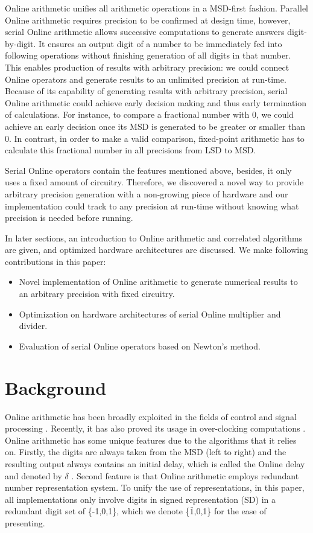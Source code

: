 \documentclass{sig-alternate}
\begin{document}
	Online arithmetic unifies all arithmetic operations in a MSD-first fashion. Parallel Online arithmetic requires precision to be confirmed at design time, however, serial Online arithmetic allows successive computations to generate answers digit-by-digit. 
	It ensures an output digit of a number to be immediately fed into following operations without finishing generation of all digits in that number. 
	This enables production of results with arbitrary precision: we could connect Online operators and generate results to an unlimited precision at run-time. 
	Because of its capability of generating results with arbitrary precision, serial Online arithmetic could achieve early decision making and thus early termination of calculations. 
	For instance, to compare a fractional number with $0$, we could achieve an early decision once its MSD is generated to be greater or smaller than $0$. In contrast, in order to make a valid comparison, fixed-point arithmetic has to calculate this fractional number in all precisions from LSD to MSD.
	
	Serial Online operators contain the features mentioned above, besides, it only uses a fixed amount of circuitry. Therefore, we discovered a novel way to provide arbitrary precision generation with a non-growing piece of hardware and our implementation could track to any precision at run-time without knowing what precision is needed before running.   
	
	In later sections, an introduction to Online arithmetic and correlated algorithms are given, and optimized hardware architectures are discussed.	
	We make following contributions in this paper:
	\begin{itemize}
		\item Novel implementation of Online arithmetic to generate numerical results to an arbitrary precision with fixed circuitry.
		\item Optimization on hardware architectures of serial Online multiplier and divider.
		\item Evaluation of serial Online operators based on Newton's method.   
	\end{itemize}
	\section{Background}
	Online arithmetic has been broadly exploited in the fields of control and signal processing \cite{online_control}\cite{online_signal_processing}. Recently, it has also proved its usage in over-clocking computations \cite{Kan_overclocking}. Online arithmetic has some unique features due to the algorithms that it relies on. Firstly, the digits are always taken from the MSD (left to right) and the resulting output always contains an initial delay, which is called the Online delay and denoted by $\delta$ \cite{digital_arithmetic_book}. Second feature is that Online arithmetic employs redundant number representation system. To unify the use of representations, in this paper, all implementations only involve digits in signed representation (SD) in a redundant digit set of \{-1,0,1\}, which we denote \{$\bar{1}$,0,1\} for the ease of presenting. 
	
\end{document}
